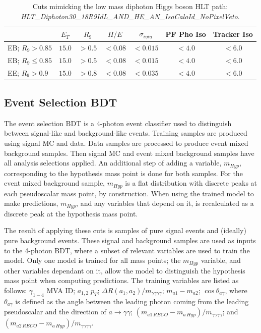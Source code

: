 \documentclass[12pt]{article}
\begin{document}
\begin{table}
   \centering
   \begin{tabular}{l|c|c|c|c|c|c}
        & $E_T$ & $R_9$ & $H/E$ & $\sigma_{i\eta i\eta}$ & PF Pho Iso & Tracker Iso\\ \hline
       EB; $R_9>0.85$ & $15.0$ & $> 0.5$ & $<0.08$ & $<0.015$ & $<4.0$ & $<6.0$\\
       EB; $R_9\leq0.85$ & $15.0$ & $> 0.5$ & $<0.08$ & $<0.015$ & $<4.0$ & $<6.0$\\
       EE; $R_9>0.9$ & $15.0$ & $> 0.8$ & $<0.08$ & $<0.035$ & $<4.0$ & $<6.0$
   \end{tabular}
   \caption{Cuts mimicking the low mass diphoton Higgs boson HLT path:\\ \textit{HLT\_Diphoton30\_18R9IdL\_AND\_HE\_AN\_IsoCaloId\_NoPixelVeto}.}
   \label{tab:hlt_cuts_2018}
\end{table}

\subsection{Event Selection BDT}
The event selection BDT is a 4-photon event classifier used to distinguish between signal-like and background-like events. Training samples are produced using signal MC and data. Data samples are processed to produce event mixed background samples. Then signal MC and event mixed background samples have all analysis selections applied. An additional step of adding a variable, $m_{Hyp}$, corresponding to the hypothesis mass point is done for both samples. For the event mixed background sample, $m_{Hyp}$ is a flat distribution with discrete peaks at each pseudoscalar mass point, by construction. When using the trained model to make predictions, $m_{Hyp}$, and any variables that depend on it, is recalculated as a discrete peak at the hypothesis mass point.\par

The result of applying these cuts is samples of pure signal events and (ideally) pure background events. These signal and background samples are used as inputs to the 4-photon BDT, where a subset of relevant variables are used to train the model. Only one model is trained for all mass points; the $m_{Hyp}$ variable, and other variables dependant on it, allow the model to distinguish the hypothesis mass point when computing predictions. The training variables are listed as follows: $\gamma_{1-4}$ MVA ID; $a_{1,2}\; p_T$; $\Delta R(a_{1}, a_{2})/m_{\gamma\gamma\gamma\gamma}$; $m_{a1} - m_{a2}$; $\cos\theta_{a\gamma}$, where $\theta_{a\gamma}$ is defined as the angle between the leading photon coming from the leading pseudoscalar and the direction of $a\rightarrow\gamma\gamma$; $(m_{a1\,RECO} - m_{a\, Hyp})/m_{\gamma\gamma\gamma\gamma}$; and $(m_{a2\,RECO} - m_{a\, Hyp})/m_{\gamma\gamma\gamma\gamma}$.
\end{document}
